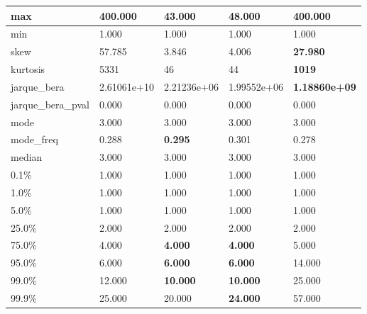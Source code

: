 \begin{table}[H]
\begin{tabular}{|l|m{10em}|m{10em}|m{10em}|m{10em}|}
\hline max & 400.000 & \cellcolor[rgb]{0.9, 0.54, 0.52} 43.000 & 48.000 & \bfseries 400.000 \\
\hline min & 1.000 & 1.000 & 1.000 & 1.000 \\
\hline skew & 57.785 & \cellcolor[rgb]{0.9, 0.54, 0.52} 3.846 & 4.006 & \bfseries 27.980 \\
\hline kurtosis & 5331 & 46 & \cellcolor[rgb]{0.9, 0.54, 0.52} 44 & \bfseries 1019 \\
\hline jarque\_bera & 2.61061e+10 & 2.21236e+06 & \cellcolor[rgb]{0.9, 0.54, 0.52} 1.99552e+06 & \bfseries 1.18860e+09 \\
\hline jarque\_bera\_pval & 0.000 & 0.000 & 0.000 & 0.000 \\
\hline mode & 3.000 & 3.000 & 3.000 & 3.000 \\
\hline mode\_freq & 0.288 & \bfseries 0.295 & \cellcolor[rgb]{0.9, 0.54, 0.52} 0.301 & 0.278 \\
\hline median & 3.000 & 3.000 & 3.000 & 3.000 \\
\hline 0.1\% & 1.000 & 1.000 & 1.000 & 1.000 \\
\hline 1.0\% & 1.000 & 1.000 & 1.000 & 1.000 \\
\hline 5.0\% & 1.000 & 1.000 & 1.000 & 1.000 \\
\hline 25.0\% & 2.000 & 2.000 & 2.000 & 2.000 \\
\hline 75.0\% & 4.000 & \bfseries 4.000 & \bfseries 4.000 & \cellcolor[rgb]{0.9, 0.54, 0.52} 5.000 \\
\hline 95.0\% & 6.000 & \bfseries 6.000 & \bfseries 6.000 & \cellcolor[rgb]{0.9, 0.54, 0.52} 14.000 \\
\hline 99.0\% & 12.000 & \bfseries 10.000 & \bfseries 10.000 & \cellcolor[rgb]{0.9, 0.54, 0.52} 25.000 \\
\hline 99.9\% & 25.000 & 20.000 & \bfseries 24.000 & \cellcolor[rgb]{0.9, 0.54, 0.52} 57.000 \\
\hline
\end{tabular}
\end{table}
